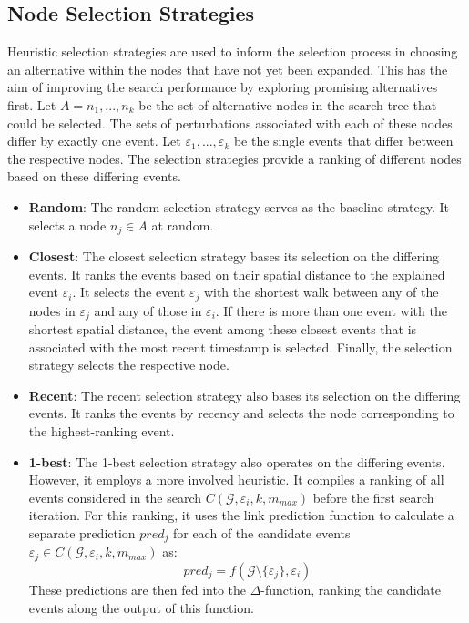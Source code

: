 \FloatBarrier

\subsection{Node Selection Strategies}
\label{s_Methodology_Selection}

Heuristic selection strategies are used to inform the selection process in choosing an alternative within the nodes that have not yet been expanded. This has the aim of improving the search performance by exploring promising alternatives first. Let $A = {n_1,...,n_k}$ be the set of alternative nodes in the search tree that could be selected. The sets of perturbations associated with each of these nodes differ by exactly one event. Let $\varepsilon_1, ..., \varepsilon_k$ be the single events that differ between the respective nodes. The selection strategies provide a ranking of different nodes based on these differing events.

\begin{itemize}
    \item \textbf{Random}: The random selection strategy serves as the baseline strategy. It selects a node $n_j \in A$ at random.
    \item \textbf{Closest}: The closest selection strategy bases its selection on the differing events. It ranks the events based on their spatial distance to the explained event $\varepsilon_i$. It selects the event $\varepsilon_j$ with the shortest walk between any of the nodes in $\varepsilon_j$ and any of those in $\varepsilon_i$. If there is more than one event with the shortest spatial distance, the event among these closest events that is associated with the most recent timestamp is selected. Finally, the selection strategy selects the respective node.
    \item \textbf{Recent}: The recent selection strategy also bases its selection on the differing events. It ranks the events by recency and selects the node corresponding to the highest-ranking event.
    \item \textbf{1-best}: The 1-best selection strategy also operates on the differing events. However, it employs a more involved heuristic. It compiles a ranking of all events considered in the search $C(\mathcal{G}, \varepsilon_i, k, m_{max})$ before the first search iteration. For this ranking, it uses the link prediction function to calculate a separate prediction $pred_j$ for each of the candidate events $\varepsilon_j \in C(\mathcal{G}, \varepsilon_i, k, m_{max})$ as:
    \begin{equation}
        pred_j = f(\mathcal{G} \setminus \{\varepsilon_j\}, \varepsilon_i)
    \end{equation}
    These predictions are then fed into the $\Delta$-function, ranking the candidate events along the output of this function.
\end{itemize}



